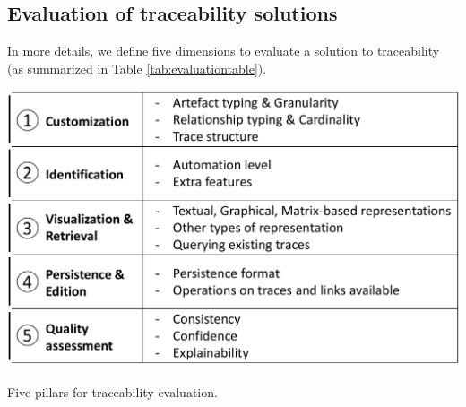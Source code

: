 \subsection{Evaluation of traceability solutions}\label{sec:protocol-evaluation}
In more details, we define five dimensions to evaluate a solution to traceability (as summarized in Table \ref{tab:evaluationtable}).
\begin{table}[h]  
	\centering
	\includegraphics[width=.65\linewidth]{images/evaluation-table.pdf}
	\caption{Five pillars for traceability evaluation.}
	\label{tab:evaluationtable}
\end{table}

